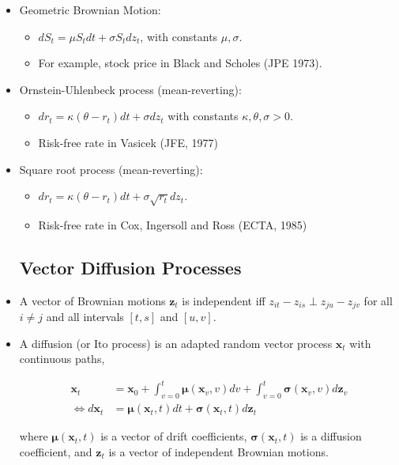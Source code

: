 \documentclass{article}
\newcommand{\xbf}{\mathbf{x}}
\newcommand{\zbf}{\mathbf{z}}
\newcommand{\mubf}{\boldsymbol{\mu}}
\newcommand{\sigmabf}{\boldsymbol{\sigma}}
\begin{document}
\begin{itemize}
\item Geometric Brownian Motion:

\begin{itemize}
\item $dS_t = \mu S_t dt + \sigma S_t dz_t$, with constants $\mu, \sigma$.
\item For example, stock price in Black and Scholes (JPE 1973).
\end{itemize}

\item Ornstein-Uhlenbeck process (mean-reverting): 

\begin{itemize}
\item $dr_t = \kappa (\theta - r_t)dt + \sigma dz_t$ with constants $\kappa, \theta, \sigma > 0$.
\item Risk-free rate in Vasicek (JFE, 1977)
\end{itemize}

\item Square root process (mean-reverting): 

\begin{itemize}
\item $dr_t = \kappa(\theta - r_t) dt + \sigma \sqrt{r_t} dz_t$.
\item Risk-free rate in Cox, Ingersoll and Ross (ECTA, 1985)
\end{itemize}

\pagebreak

\subsection*{Vector Diffusion Processes}

\item A vector of Brownian motions $\zbf_t$ is independent iff $z_{it} - z_{is} \perp z_{ju} - z_{jv}$ for all $i \neq j$ and all intervals $[t, s]$ and $[u, v]$.

\item A diffusion (or Ito process) is an adapted random vector process $\mathbf{x}_t$ with continuous paths,

\begin{align*}
\xbf_t &= \xbf_0 + \int_{v=0}^t \mubf(\xbf_v, v)dv + \int_{v=0}^t \sigmabf(\xbf_v, v) d\zbf_v \\
\iff d\xbf_t &= \mubf(\xbf_t, t)dt + \sigmabf(\xbf_t, t) d\zbf_t
\end{align*}

where $\mubf(\xbf_t, t)$ is a vector of drift coefficients, $\sigmabf(\xbf_t, t)$ is a diffusion coefficient, and $\zbf_t$ is a vector of independent Brownian motions.


\end{itemize}
\end{document}

